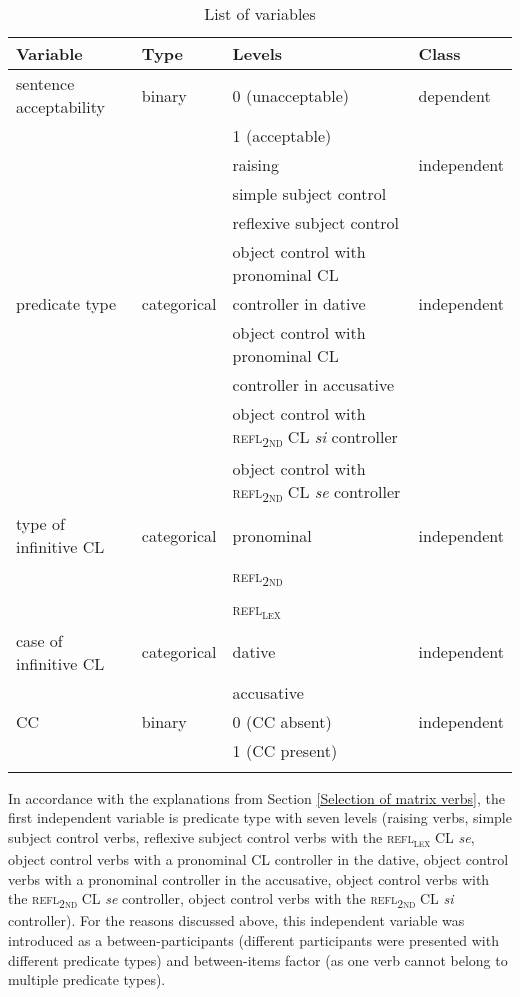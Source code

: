 \begin{sidewaystable}
\caption{List of variables\label{T16.X1}}
\begin{tabular}{llll}
\lsptoprule
Variable& Type& Levels& Class\\\midrule
sentence acceptability& binary& 0 (unacceptable) & dependent \\
 &&1 (acceptable) & \\
\tablevspace
 && raising & independent  \\
 && simple subject control &   \\
 && reflexive subject control & \\
 && object control with pronominal CL &   \\
\tablevspace
predicate type& categorical& controller in dative & independent \\
 && object control with pronominal CL &  \\
 && controller in accusative &  \\
 && object control with \textsc{refl\textsubscript{2nd}} CL \textit{si} controller &  \\
 && object control with \textsc{refl\textsubscript{2nd}} CL \textit{se} controller &  \\
\tablevspace
type of infinitive CL& categorical & pronominal & independent \\
 && \textsc{refl\textsubscript{2nd}} &  \\
 && \textsc{refl\textsubscript{\textsc{lex}}} &  \\
\tablevspace
case of infinitive CL& categorical & dative & independent \\
 && accusative &  \\
\tablevspace
CC& binary& 0 (CC absent) & independent \\
 && 1 (CC present) &  \\
\lspbottomrule
\end{tabular}
\end{sidewaystable}

In accordance with the explanations from Section \ref{Selection of matrix verbs}, the first independent variable is predicate type with seven levels (raising verbs, simple subject control verbs, reflexive subject control verbs with the \textsc{refl\textsubscript{\textsc{lex}}} CL \textit{se}, object control verbs with a pronominal CL controller in the dative, object control verbs with a pronominal controller in the accusative, object control verbs with the \textsc{refl\textsubscript{2nd}} CL \textit{se} controller, object control verbs with the \textsc{refl\textsubscript{2nd}} CL \textit{si} controller). For the reasons discussed above, this independent variable was introduced as a between-participants (different participants were presented with different predicate types) and between-items factor (as one verb cannot belong to multiple predicate types). 

